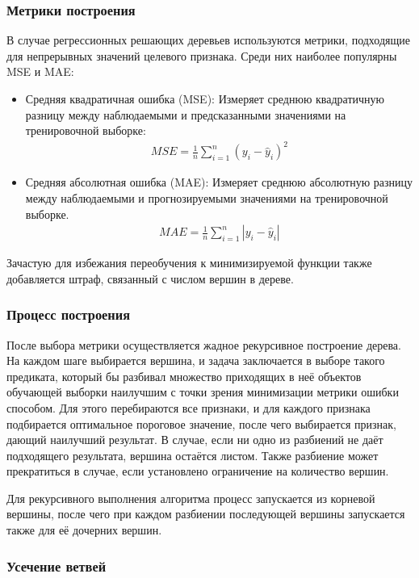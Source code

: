 \subsubsection{Метрики построения}
В случае регрессионных решающих деревьев используются метрики, подходящие для непрерывных значений целевого признака. Среди них наиболее популярны MSE и MAE:
\begin{itemize}
    \item  Средняя квадратичная ошибка (MSE): Измеряет среднюю квадратичную разницу между наблюдаемыми и предсказанными значениями на тренировочной выборке:
          \begin{align*}
              MSE = \frac{1}{n} \sum_{i=1}^{n} (y_i - \hat{y}_i)^2
          \end{align*}
    \item Средняя абсолютная ошибка (MAE): Измеряет среднюю абсолютную разницу между наблюдаемыми и прогнозируемыми значениями на тренировочной выборке.
          \begin{align*}
              MAE = \frac{1}{n} \sum_{i=1}^{n} |y_i - \hat{y}_i|
          \end{align*}
\end{itemize}

Зачастую для избежания переобучения к минимизируемой функции также добавляется штраф, связанный с числом вершин в дереве.

\subsubsection{Процесс построения}
После выбора метрики осуществляется жадное рекурсивное построение дерева. На каждом шаге выбирается вершина, и задача заключается в выборе такого предиката, который бы разбивал множество приходящих в неё объектов обучающей выборки наилучшим с точки зрения минимизации метрики ошибки способом. Для этого перебираются все признаки, и для каждого признака подбирается оптимальное пороговое значение, после чего выбирается признак, дающий наилучший результат. В случае, если ни одно из разбиений не даёт подходящего результата, вершина остаётся листом. Также разбиение может прекратиться в случае, если установлено ограничение на количество вершин.

Для рекурсивного выполнения алгоритма процесс запускается из корневой вершины, после чего при каждом разбиении последующей вершины запускается также для её дочерних вершин.

\subsubsection{Усечение ветвей}

